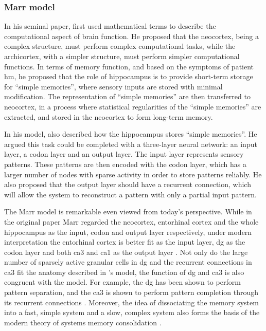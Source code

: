 \subsubsection{Marr model \label{hpc-marr}}
In his seminal paper, \citet{marr71} first used mathematical terms to describe the computational aspect of brain function. He proposed that the neocortex, being a complex structure, must perform complex computational tasks, while the archicortex, with a simpler structure, must perform simpler computational functions. In terms of memory function, and based on the symptoms of patient \gls{hm}, he proposed that the role of hippocampus is to provide short-term storage for ``simple memories'', where sensory inputs are stored with minimal modification. The representation of ``simple memories'' are then transferred to neocortex, in a process where statistical regularities of the ``simple memories'' are extracted, and stored in the neocortex to form long-term memory. 

In his model, \citet{marr71} also described how the hippocampus stores ``simple memories''. He argued this task could be completed with a three-layer neural network: an input layer, a codon layer and an output layer. The input layer represents sensory patterns. These patterns are then encoded with the codon layer, which has a larger number of nodes with sparse activity in order to store patterns reliably. He also proposed that the output layer should have a recurrent connection, which will allow the system to reconstruct a pattern with only a partial input pattern. 

The Marr model is remarkable even viewed from today's perspective. While in the original paper Marr \citep{marr71} regarded the neocortex, entorhinal cortex and the whole hippocampus as the input, codon and output layer respectively, under modern interpretation the entorhinal cortex is better fit as the input layer, \gls{dg} as the codon layer and both \gls{ca3} and \gls{ca1} as the output layer \citep{willshaw15}. Not only do the large number of sparsely active granular cells in \gls{dg} and the recurrent connections in \gls{ca3} fit the anatomy described in \citet{marr71}'s model, the function of \gls{dg} and \gls{ca3} is also congruent with the model. For example, the \gls{dg} has been shown to perform pattern separation, and the \gls{ca3} is shown to perform pattern completion through its recurrent connections \citep{knierim16}. Moreover, the idea of dissociating the memory system into a fast, simple system and a slow, complex system also forms the basis of the modern theory of systems memory consolidation \citep{squire92, mcclelland13}. 

